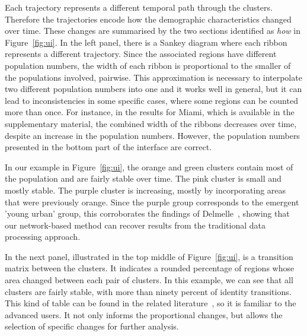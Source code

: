 Each trajectory represents a different temporal path through the clusters.
Therefore the trajectories encode how the demographic characteristics changed
over time. These changes are summarised by the two sections identified as
\emph{how} in Figure~\ref{fig:ui}. In the left panel, there is a Sankey diagram
where each ribbon represents a different trajectory. Since the associated
regions have different population numbers, the width of each ribbon is
proportional to the smaller of the populations involved, pairwise. This
approximation is necessary to interpolate two different population numbers into
one and it works well in general, but it can lead to inconsistencies in some
specific cases, where some regions can be counted more than once. For instance,
in the results for Miami, which is available in the supplementary material, the
combined width of the ribbons decreases over time, despite an increase in the
population numbers. However, the population numbers presented in the bottom part
of the interface are correct.

In our example in Figure~\ref{fig:ui}, the orange and green clusters contain
most of the population and are fairly stable over time. The pink cluster is
small and mostly stable. The purple cluster is increasing, mostly by
incorporating areas that were previously orange. Since the purple group
corresponds to the emergent 'young urban' group, this corroborates the findings
of Delmelle~\citep{Delmelle2016,Delmelle2017}, showing that our network-based
method can recover results from the traditional data processing approach.

In the next panel, illustrated in the top middle of Figure~\ref{fig:ui}, is a
transition matrix between the clusters. It indicates a rounded percentage of
regions whose area changed between each pair of clusters. In this example, we
can see that all clusters are fairly stable, with more than ninety percent of
identity transitions. This kind of table can be found in the related
literature~\citep{Delmelle2016}, so it is familiar to the advanced users. It not
only informs the proportional changes, but allows the selection of specific
changes for further analysis.


